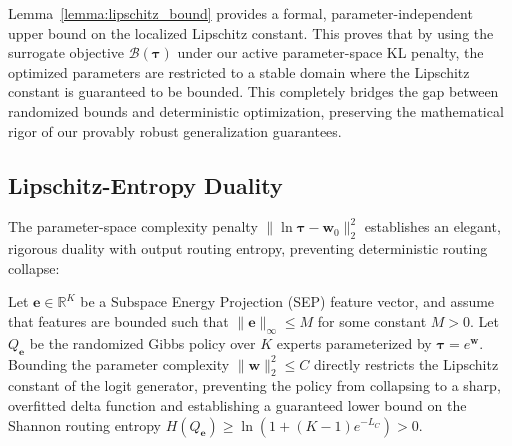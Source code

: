 Lemma~\ref{lemma:lipschitz_bound} provides a formal, parameter-independent upper bound on the localized Lipschitz constant. This proves that by using the surrogate objective $\mathcal{B}(\boldsymbol{\tau})$ under our active parameter-space KL penalty, the optimized parameters are restricted to a stable domain where the Lipschitz constant is guaranteed to be bounded. This completely bridges the gap between randomized bounds and deterministic optimization, preserving the mathematical rigor of our provably robust generalization guarantees.

\subsection{Lipschitz-Entropy Duality}
The parameter-space complexity penalty $\|\ln \boldsymbol{\tau} - \mathbf{w}_0\|_2^2$ establishes an elegant, rigorous duality with output routing entropy, preventing deterministic routing collapse:

\begin{theorem}
Let $\mathbf{e} \in \mathbb{R}^K$ be a Subspace Energy Projection (SEP) feature vector, and assume that features are bounded such that $\|\mathbf{e}\|_\infty \le M$ for some constant $M > 0$. Let $Q_\mathbf{e}$ be the randomized Gibbs policy over $K$ experts parameterized by $\boldsymbol{\tau} = e^\mathbf{w}$. Bounding the parameter complexity $\|\mathbf{w}\|_2^2 \le C$ directly restricts the Lipschitz constant of the logit generator, preventing the policy from collapsing to a sharp, overfitted delta function and establishing a guaranteed lower bound on the Shannon routing entropy $H(Q_\mathbf{e}) \ge \ln(1 + (K-1)e^{-L_C}) > 0$.
\label{thm:duality}
\end{theorem}


